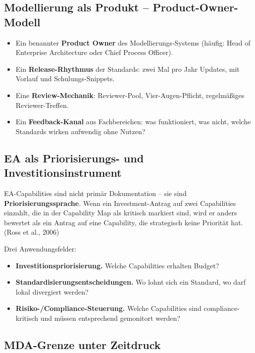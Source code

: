 \documentclass[11pt,a4paper,oneside]{article}
\newcommand{\fachbegriff}[1]{\textbf{#1}}
\newcommand{\quelle}[1]{{\footnotesize\color{lpGray}(#1)}}
\begin{document}
\subsection{Modellierung als Produkt -- Product-Owner-Modell}

\begin{itemize}
  \item Ein benannter \fachbegriff{Product Owner} des Modellierungs-Systems (häufig: Head of Enterprise Architecture oder Chief Process Officer).
  \item Ein \fachbegriff{Release-Rhythmus} der Standards: zwei Mal pro Jahr Updates, mit Vorlauf und Schulungs-Snippets.
  \item Eine \fachbegriff{Review-Mechanik}: Reviewer-Pool, Vier-Augen-Pflicht, regelmäßiges Reviewer-Treffen.
  \item Ein \fachbegriff{Feedback-Kanal} aus Fachbereichen: was funktioniert, was nicht, welche Standards wirken aufwendig ohne Nutzen?
\end{itemize}

\subsection{EA als Priorisierungs- und Investitionsinstrument}

EA-Capabilities sind nicht primär Dokumentation -- sie sind \fachbegriff{Priorisierungssprache}. Wenn ein Investment-Antrag auf zwei Capabilities einzahlt, die in der Capability Map als kritisch markiert sind, wird er anders bewertet als ein Antrag auf eine Capability, die strategisch keine Priorität hat. \quelle{Ross et al., 2006}

Drei Anwendungsfelder:

\begin{itemize}
  \item \textbf{Investitions\-priorisierung.} Welche Capabilities erhalten Budget?
  \item \textbf{Standardisierungs\-entscheidungen.} Wo lohnt sich ein Standard, wo darf lokal divergiert werden?
  \item \textbf{Risiko-/Compliance-Steuerung.} Welche Capabilities sind compliance-kritisch und müssen entsprechend gemonitort werden?
\end{itemize}

\subsection{MDA-Grenze unter Zeitdruck}
\end{document}
